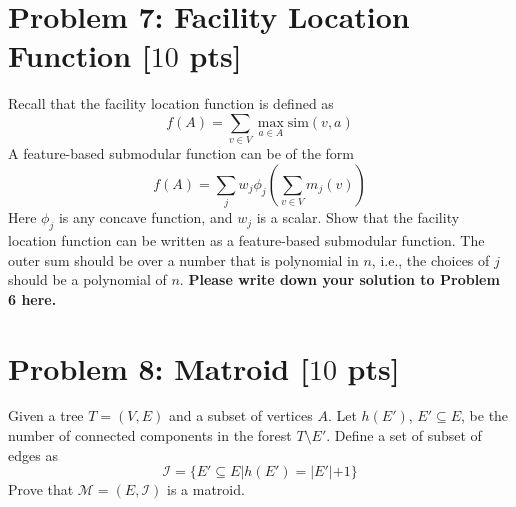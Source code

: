 \documentclass[letterpaper, 11pt]{article}
\newcommand{\1}{\mathds{1}}	%
\theoremstyle{definition}
\newcommand{\problem}[1]{\section*{Problem #1}}
\newenvironment{solution}{{\par\noindent\it Solution.}}{}
\begin{document}
\problem{7: Facility Location Function [$10$ pts]}
Recall that the facility location function is defined as
$$f(A) = \sum_{v \in V} \max_{a \in A} \text{sim}(v,a)$$
A feature-based submodular function can be of the form
$$f(A) = \sum_j w_j\phi_j(\sum_{v \in V} m_j(v))$$
Here $\phi_j$ is any concave function, and $w_j$ is a scalar. Show that the facility location function can be written as a feature-based submodular function. The outer sum should be over a number that is polynomial in $n$, i.e., the choices of $j$ should be a polynomial of $n$.
\begin{solution}
\textbf{Please write down your solution to Problem 6 here.}
\end{solution}
\clearpage


\problem{8: Matroid [$10$ pts]}
Given a tree $T = (V, E)$ and a subset of vertices $A$. Let $h(E')$, $E' \subseteq E$, be the number of connected components in the forest $T \setminus E'$. Define a set of subset of edges as 
$$\mathcal{I} = \{E' \subseteq E | h(E') = |E'| + 1\}$$
Prove that $\mathcal{M} = (E,\mathcal{I})$ is a matroid.
\end{document}
